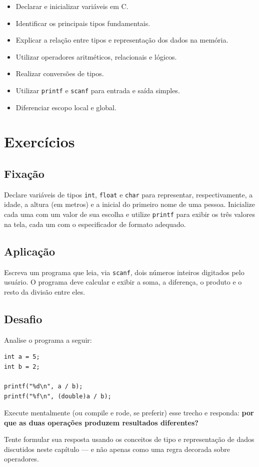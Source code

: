 \documentclass[12pt,a4paper,oneside]{extreport}
\begin{document}
\begin{tcolorbox}[title={Ao final deste capítulo, você deve ser capaz de:}]
\begin{itemize}
    \item Declarar e inicializar variáveis em C.
    \item Identificar os principais tipos fundamentais.
    \item Explicar a relação entre tipos e representação dos dados na memória.
    \item Utilizar operadores aritméticos, relacionais e lógicos.
    \item Realizar conversões de tipos.
    \item Utilizar \texttt{printf} e \texttt{scanf} para entrada e saída simples.
    \item Diferenciar escopo local e global.
\end{itemize}
\end{tcolorbox}

\section*{Exercícios}

\begin{exercicio}

\subsection*{Fixação}
Declare variáveis de tipos \texttt{int}, \texttt{float} e \texttt{char} para representar, respectivamente, a idade, a altura (em metros) e a inicial do primeiro nome de uma pessoa. Inicialize cada uma com um valor de sua escolha e utilize \texttt{printf} para exibir os três valores na tela, cada um com o especificador de formato adequado.


\subsection*{Aplicação}
Escreva um programa que leia, via \texttt{scanf}, dois números inteiros digitados pelo usuário. O programa deve calcular e exibir a soma, a diferença, o produto e o resto da divisão entre eles.


\subsection*{Desafio}
Analise o programa a seguir:

\begin{lstlisting}
int a = 5;
int b = 2;

printf("%d\n", a / b);
printf("%f\n", (double)a / b);
\end{lstlisting}

Execute mentalmente (ou compile e rode, se preferir) esse trecho e responda: \textbf{por que as duas operações produzem resultados diferentes?}

Tente formular sua resposta usando os conceitos de tipo e representação de dados discutidos neste capítulo — e não apenas como uma regra decorada sobre operadores.


\end{exercicio}
\end{document}
